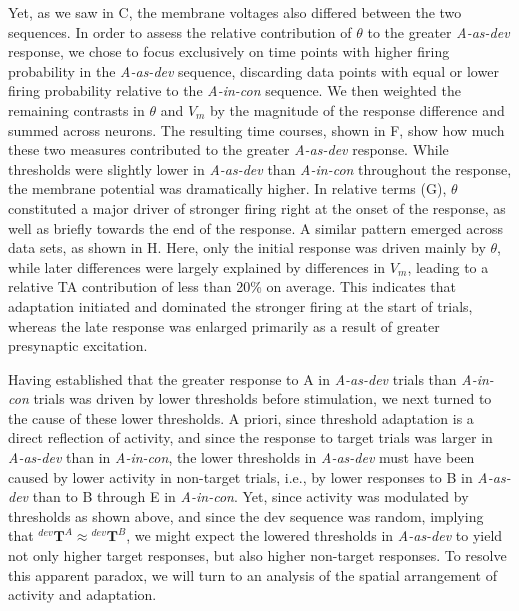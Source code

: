 \documentclass[9pt,lineno,onehalfspacing]{elife}
\newcommand{\dev}{\textit{A-as-dev}}
\newcommand{\msc}{\textit{A-in-con}}
\newcommand{\T}[3][]{{}^{#1}_{}\boldsymbol T^{#2}_{#3}}
\begin{document}
Yet, as we saw in C, the membrane voltages also differed between the two sequences. In order to assess the relative contribution of $\theta$ to the greater \dev{} response, we chose to focus exclusively on time points with higher firing probability in the \dev{} sequence, discarding data points with equal or lower firing probability relative to the \msc{} sequence. We then weighted the remaining contrasts in $\theta$ and $V_m$ by the magnitude of the response difference and summed across neurons. The resulting time courses, shown in F, show how much these two measures contributed to the greater \dev{} response. While thresholds were slightly lower in \dev{} than \msc{} throughout the response, the membrane potential was dramatically higher. In relative terms (G), $\theta$ constituted a major driver of stronger firing right at the onset of the response, as well as briefly towards the end of the response. A similar pattern emerged across data sets, as shown in H. Here, only the initial response was driven mainly by $\theta$, while later differences were largely explained by differences in $V_m$, leading to a relative TA contribution of less than 20\% on average. This indicates that adaptation initiated and dominated the stronger firing at the start of trials, whereas the late response was enlarged primarily as a result of greater presynaptic excitation.

Having established that the greater response to A in \dev{} trials than \msc{} trials was driven by lower thresholds before stimulation, we next turned to the cause of these lower thresholds. A priori, since threshold adaptation is a direct reflection of activity, and since the response to target trials was larger in \dev{} than in \msc{}, the lower thresholds in \dev{} must have been caused by lower activity in non-target trials, i.e., by lower responses to B in \dev{} than to B through E in \msc{}. Yet, since activity was modulated by thresholds as shown above, and since the dev sequence was random, implying that $\T[dev]{A}{} \approx \T[dev]{B}{}$, we might expect the lowered thresholds in \dev{} to yield not only higher target responses, but also higher non-target responses. To resolve this apparent paradox, we will turn to an analysis of the spatial arrangement of activity and adaptation.
\end{document}
